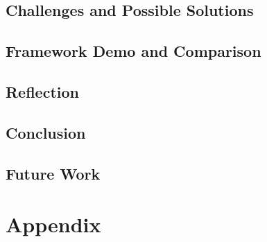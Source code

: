 \chapter{Challenges and Possible Solutions}




\chapter{Framework Demo and Comparison}









\chapter{Reflection}


\chapter{Conclusion}


\chapter{Future Work}


\printbibliography

\part{Appendix}
\appendix



